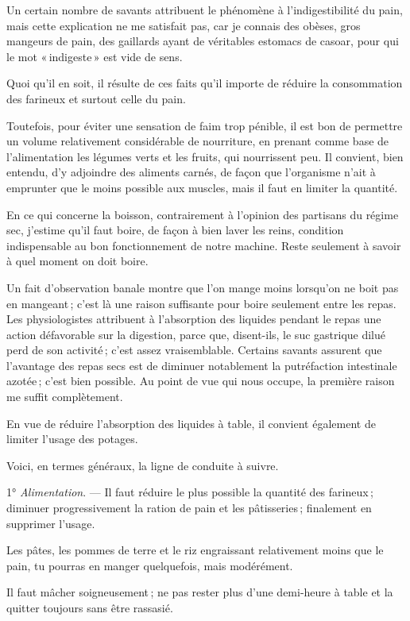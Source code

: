Un certain nombre de savants attribuent le phénomène à l'indigestibilité du
pain, mais cette explication ne me satisfait pas, car je connais des obèses,
gros mangeurs de pain, des gaillards ayant de véritables estomacs de casoar,
pour qui le mot « indigeste » est vide de sens.

Quoi qu'il en soit, il résulte de ces faits qu'il importe de réduire la
consommation des farineux et surtout celle du pain.

Toutefois, pour éviter une sensation de faim trop pénible, il est bon de
permettre un volume relativement considérable de nourriture, en prenant comme
base de l'alimentation les légumes verts et les fruits, qui nourrissent peu. Il
convient, bien entendu, d'y adjoindre des aliments carnés, de façon que
l'organisme n'ait à emprunter que le moins possible aux muscles, mais il faut
en limiter la quantité.

En ce qui concerne la boisson, contrairement à l’opinion des partisans du
régime sec, j'estime qu'il faut boire, de façon à bien laver les reins,
condition indispensable au bon fonctionnement de notre machine. Reste seulement
à savoir à quel moment on doit boire.

Un fait d'observation banale montre que l'on mange moins lorsqu'on ne boit pas
en mangeant ; c'est là une raison suffisante pour boire seulement entre les
repas. Les physiologistes attribuent à l'absorption des liquides pendant le
repas une action défavorable sur la digestion, parce que, disent-ils, le suc
gastrique dilué perd de son activité ; c'est assez vraisemblable. Certains
savants assurent que l'avantage des repas secs est de diminuer notablement la
putréfaction intestinale azotée ; c'est bien possible. Au point de vue qui nous
occupe, la première raison me suffit complètement.

En vue de réduire l'absorption des liquides à table, il convient également de
limiter l'usage des potages.

Voici, en termes généraux, la ligne de conduite à suivre.

1° \textit{Alimentation}. — Il faut réduire le plus possible la quantité des
farineux ; diminuer progressivement la ration de pain et les pâtisseries ;
finalement en supprimer l'usage.

Les pâtes, les pommes de terre et le riz engraissant relativement moins que le
pain, tu pourras en manger quelquefois, mais modérément.

Il faut mâcher soigneusement ; ne pas rester plus d'une demi-heure à table et
la quitter toujours sans être rassasié.

